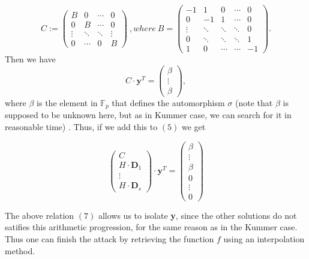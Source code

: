 \documentclass[10pt]{article}
\newcommand{\cd}{\cdot}
\begin{document}
\begin{equation*}
C := 
\begin{pmatrix}
B & 0 & \cdots & 0 \\
0 & B & \cdots & 0 \\
\vdots & \ddots & \ddots & \vdots \\
0 & \cdots & 0 & B
\end{pmatrix} \ , where \ 
B = 
\begin{pmatrix}
-1 & 1 & 0 & \cdots & 0 \\
0 & -1 & 1 & \cdots & 0 \\
\vdots & \ddots & \ddots & \ddots & 0 \\
0 & \ddots & \ddots & \ddots & 1 \\
1 & 0 & \cdots & \cdots & -1
\end{pmatrix}.
\end{equation*}
 Then we have
\begin{equation*}
C \cd \textbf{y}^T
= 
\begin{pmatrix}
\beta \\
\vdots \\
\beta
\end{pmatrix},
\end{equation*}
where $\beta$ is the element in $\mathbb{F}_p$ that defines the automorphism $\sigma$ (note that $\beta$ is supposed to be unknown here, but as in Kummer case, we can search for it in reasonable time) . Thus, if we add this to $(5)$ we get

\begin{equation}
\begin{pmatrix}
C\\
H \cd \textbf{D}_1 \\
\vdots \\
H \cd \textbf{D}_s
\end{pmatrix}
\cd \textbf{y}^T = 
\begin{pmatrix}
\beta \\
\vdots \\
\beta \\
0 \\
\vdots \\
0
\end{pmatrix} 
\end{equation}

The above relation $(7)$ allows us to isolate \textbf{y}, since the other solutions do not satifies this arithmetic progression, for the same reason as in the Kummer case. Thus one can finish the attack by retrieving the function $f$ using an interpolation method. 
\end{document}
